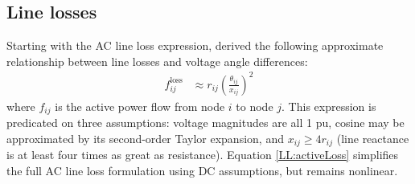 \documentclass[conference]{IEEEtran}
\begin{document}
\subsection{Line losses}
Starting with the AC line loss expression, \cite{almassalkhi2014} derived the following approximate relationship between line losses and voltage angle differences:
\begin{align}
\label{LL:activeLoss}
f_{ij}^{\text{loss}} &\approx r_{ij}\left(\frac{\theta_{ij}}{x_{ij}}\right)^2
\end{align}
where $f_{ij}$ is the active power flow from node $i$ to node $j$. This expression is predicated on three assumptions: voltage magnitudes are all 1 pu, cosine may be approximated by its second-order Taylor expansion, and $x_{ij} \geq 4r_{ij}$ (line reactance is at least four times as great as resistance). Equation \eqref{LL:activeLoss} simplifies the full AC line loss formulation using DC assumptions, but remains nonlinear.

\end{document}
